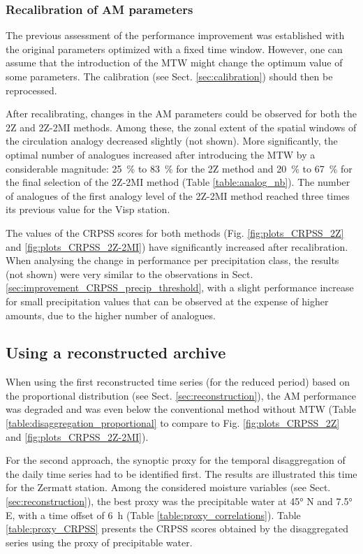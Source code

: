 \documentclass[hess, manuscript]{copernicus}
\begin{document}
	
	\subsubsection{Recalibration of AM parameters}
	\label{sec:recalibration}
	
	The previous assessment of the performance improvement was established with the original parameters optimized with a fixed time window. However, one can assume that the introduction of the MTW might change the optimum value of some parameters. The calibration (see Sect. \ref{sec:calibration}) should then be reprocessed.
	
	After recalibrating, changes in the AM parameters could be observed for both the 2Z and 2Z-2MI methods. Among these, the zonal extent of the spatial windows of the circulation analogy decreased slightly (not shown). More significantly, the optimal number of analogues increased after introducing the MTW by a considerable magnitude: 25~\% to 83~\% for the 2Z method and 20~\% to 67~\% for the final selection of the 2Z-2MI method (Table \ref{table:analog_nb}). The number of analogues of the first analogy level of the 2Z-2MI method reached three times its previous value for the Visp station. 
	
	The values of the CRPSS scores for both methods (Fig. \ref{fig:plots_CRPSS_2Z} and \ref{fig:plots_CRPSS_2Z-2MI}) have significantly increased after recalibration. When analysing the change in performance per precipitation class, the results (not shown) were very similar to the observations in Sect. \ref{sec:improvement_CRPSS_precip_threshold}, with a slight performance increase for small precipitation values that can be observed at the expense of higher amounts, due to the higher number of analogues.
	
	
	\subsection{Using a reconstructed archive}
	\label{sec:reconstruction_results}
	
	When using the first reconstructed time series (for the reduced period) based on the proportional distribution (see Sect. \ref{sec:reconstruction}), the AM performance was degraded and was even below the conventional method without MTW (Table \ref{table:disaggregation_proportional} to compare to Fig. \ref{fig:plots_CRPSS_2Z} and \ref{fig:plots_CRPSS_2Z-2MI}).
	
	For the second approach, the synoptic proxy for the temporal disaggregation of the daily time series had to be identified first. The results are illustrated this time for the Zermatt station. Among the considered moisture variables (see Sect. \ref{sec:reconstruction}), the best proxy was the precipitable water at 45° N and 7.5° E, with a time offset of 6~h (Table \ref{table:proxy_correlations}). Table \ref{table:proxy_CRPSS} presents the CRPSS scores obtained by the disaggregated series using the proxy of precipitable water.
	
\end{document}
